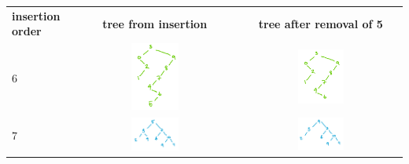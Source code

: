 \documentclass[twoside=false,DIV=14]{scrartcl}
\begin{document}
\begin{tabular}[t]{lcc}
  \textbf{insertion order} &  \textbf{tree from insertion} & \textbf{tree after removal of 5} \\
6 & \includegraphics[width=0.3\textwidth]{3_6.jpeg} & \includegraphics[width=0.3\textwidth]{3_6_removed.jpeg} \\
7 & \includegraphics[width=0.3\textwidth]{3_7.jpeg} & \includegraphics[width=0.3\textwidth]{3_7_removed.jpeg} \\
\end{tabular}
\end{document}
